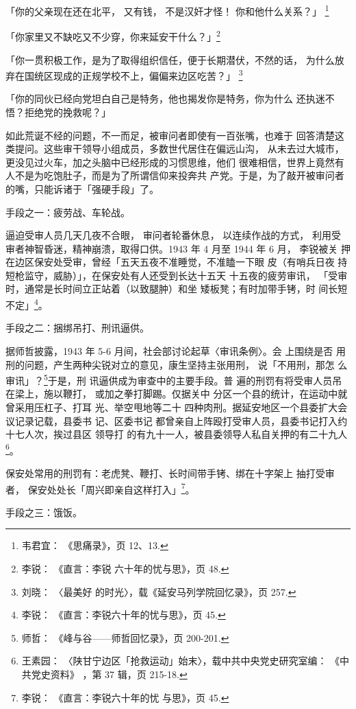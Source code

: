 「你的父亲现在还在北平， 又有钱， 不是汉奸才怪！ 你和他什么关系？」
\footnote{韦君宜： 《思痛录》，页 12、13.}

「你家里又不缺吃又不少穿，你来延安干什么？」\footnote{李锐： 《直言：李锐
六十年的忧与思》，页 48.}

「你一贯积极工作，是为了取得组织信任，便于长期潜伏，不然的话， 为什么放
弃在国统区现成的正规学校不上，偏偏来边区吃苦？」 \footnote{刘晓： 〈最美好
的时光〉，载《延安马列学院回忆录》，页 257.}

「你的同伙已经向党坦白自己是特务，他也揭发你是特务，你为什么
还执迷不悟？拒绝党的挽救呢？」

如此荒诞不经的问题，不一而足，被审问者即使有一百张嘴，也难于
回答清楚这类提问。这些审干领导小组成员，多数世代居住在偏远山沟，
从未去过大城市，更没见过火车，加之头脑中已经形成的习惯思维，他们
很难相信，世界上竟然有人不是为吃饱肚子，而是为了所谓信仰来投奔共
产党。于是，为了敲开被审问者的嘴，只能诉诸于「强硬手段」了。

手段之一：疲劳战、车轮战。

逼迫受审人员几天几夜不合眼， 审问者轮番休息， 以连续作战的方式， 利用受
审者神智昏迷，精神崩溃，取得口供。1943 年 4 月至 1944 年 6 月， 李锐被关
押在边区保安处受审，曾经「五天五夜不准睡觉，不准瞌一下眼 皮（有哨兵日夜
持短枪监守，威胁）」，在保安处有人还受到长达十五天 十五夜的疲劳审讯，
「受审时，通常是长时间立正站着（以致腿肿）和坐 矮板凳；有时加带手铐，时
间长短不定」\footnote{李锐： 《直言：李锐六十年的忧与思》，页 45.}。

手段之二：捆绑吊打、刑讯逼供。

据师哲披露，1943 年 5-6 月间，社会部讨论起草〈审讯条例〉。会 上围绕是否
用刑的问题，产生两种尖锐对立的意见，康生坚持主张用刑， 说「不用刑，那怎
么审讯」？\footnote{师哲： 《峰与谷——师哲回忆录》，页 200-201.}于是，刑
讯逼供成为审查中的主要手段。普 遍的刑罚有将受审人员吊在梁上，施以鞭打，
或加之拳打脚踢。仅据关中 分区一个县的统计，在运动中就曾采用压杠子、打耳
光、举空甩地等二十 四种肉刑。据延安地区一个县委扩大会议记录记载，县委书
记、区委书记 都曾亲自上阵殴打受审人员，县委书记打入约十七人次，挨过县区
领导打 的有九十一人，被县委领导人私自关押的有二十九人\footnote{王素园：
〈陕甘宁边区「抢救运动」始末〉，载中共中央党史研究室编： 《中共党史资料》
，第 37 辑，页 215-18.}。

保安处常用的刑罚有：老虎凳、鞭打、长时间带手铐、绑在十字架上 抽打受审者，
保安处处长「周兴即亲自这样打入」\footnote{李锐： 《直言：李锐六十年的忧
与思》，页 45.}。

手段之三：饿饭。
 
